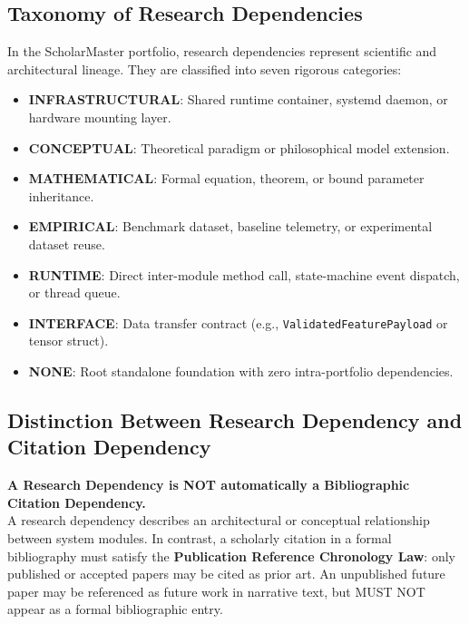 \documentclass[11pt,letterpaper]{article}
\begin{document}
\subsection{Taxonomy of Research Dependencies}
In the ScholarMaster portfolio, research dependencies represent scientific and architectural lineage. They are classified into seven rigorous categories:
\begin{itemize}[leftmargin=*]
    \item \textbf{INFRASTRUCTURAL}: Shared runtime container, systemd daemon, or hardware mounting layer.
    \item \textbf{CONCEPTUAL}: Theoretical paradigm or philosophical model extension.
    \item \textbf{MATHEMATICAL}: Formal equation, theorem, or bound parameter inheritance.
    \item \textbf{EMPIRICAL}: Benchmark dataset, baseline telemetry, or experimental dataset reuse.
    \item \textbf{RUNTIME}: Direct inter-module method call, state-machine event dispatch, or thread queue.
    \item \textbf{INTERFACE}: Data transfer contract (e.g., \texttt{ValidatedFeaturePayload} or tensor struct).
    \item \textbf{NONE}: Root standalone foundation with zero intra-portfolio dependencies.
\end{itemize}

\subsection{Distinction Between Research Dependency and Citation Dependency}
\begin{tcolorbox}[colback=red!5!white,colframe=red!70!black,title=Critical Governance Axiom]
\textbf{A Research Dependency is NOT automatically a Bibliographic Citation Dependency.}\\
\small
A research dependency describes an architectural or conceptual relationship between system modules. In contrast, a scholarly citation in a formal bibliography must satisfy the \textbf{Publication Reference Chronology Law}: only published or accepted papers may be cited as prior art. An unpublished future paper may be referenced as future work in narrative text, but MUST NOT appear as a formal bibliographic entry.
\end{tcolorbox}

\end{document}
